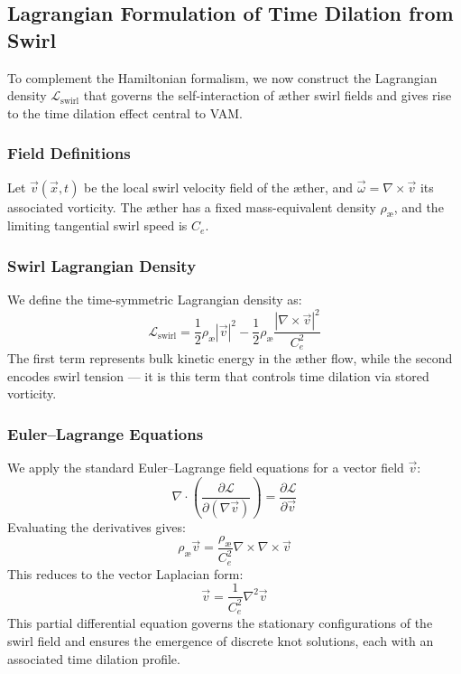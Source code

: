 \subsection{Lagrangian Formulation of Time Dilation from Swirl}
\label{subsec:lagrangian_swirl}

To complement the Hamiltonian formalism, we now construct the Lagrangian density \( \mathcal{L}_{\text{swirl}} \) that governs the self-interaction of æther swirl fields and gives rise to the time dilation effect central to VAM.

\subsubsection*{Field Definitions}

Let \( \vec{v}(\vec{x}, t) \) be the local swirl velocity field of the æther, and \( \vec{\omega} = \nabla \times \vec{v} \) its associated vorticity. The æther has a fixed mass-equivalent density \( \rho_\text{\ae} \), and the limiting tangential swirl speed is \( C_e \).

\subsubsection*{Swirl Lagrangian Density}

We define the time-symmetric Lagrangian density as:
\begin{equation}
    \mathcal{L}_{\text{swirl}} = \frac{1}{2} \rho_\text{\ae} |\vec{v}|^2 - \frac{1}{2} \rho_\text{\ae} \frac{|\nabla \times \vec{v}|^2}{C_e^2}
\end{equation}
The first term represents bulk kinetic energy in the æther flow, while the second encodes swirl tension — it is this term that controls time dilation via stored vorticity.

\subsubsection*{Euler–Lagrange Equations}

We apply the standard Euler–Lagrange field equations for a vector field \( \vec{v} \):
\begin{equation}
    \nabla \cdot \left( \frac{\partial \mathcal{L}}{\partial (\nabla \vec{v})} \right)
    = \frac{\partial \mathcal{L}}{\partial \vec{v}}
\end{equation}
Evaluating the derivatives gives:
\begin{equation}
    \rho_\text{\ae} \vec{v} = \frac{\rho_\text{\ae}}{C_e^2} \nabla \times \nabla \times \vec{v}
\end{equation}
This reduces to the vector Laplacian form:
\begin{equation}
    \boxed{
        \vec{v} = \frac{1}{C_e^2} \nabla^2 \vec{v}
    }
\end{equation}
This partial differential equation governs the stationary configurations of the swirl field and ensures the emergence of discrete knot solutions, each with an associated time dilation profile.


